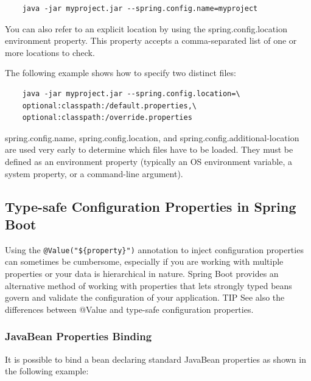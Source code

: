 \documentclass{scrartcl}
\begin{document}
\begin{lstlisting}
    java -jar myproject.jar --spring.config.name=myproject
\end{lstlisting}

You can also refer to an explicit location by using the spring.config.location environment property. This property accepts a comma-separated list of one or more locations to check.

The following example shows how to specify two distinct files:

\begin{lstlisting}
    java -jar myproject.jar --spring.config.location=\
    optional:classpath:/default.properties,\
    optional:classpath:/override.properties
\end{lstlisting}

spring.config.name, spring.config.location, and spring.config.additional-location are used very early to determine which files have to be loaded. They must be defined as an environment property (typically an OS environment variable, a system property, or a command-line argument).


\subsection{Type-safe Configuration Properties in Spring Boot}

Using the \lstinline|@Value("${property}")| annotation to inject configuration properties can sometimes be
cumbersome, especially if you are working with multiple properties or your data is hierarchical in
nature. Spring Boot provides an alternative method of working with properties that lets strongly
typed beans govern and validate the configuration of your application.
TIP
See also the differences between @Value and type-safe configuration properties.
\subsubsection{JavaBean Properties Binding}

It is possible to bind a bean declaring standard JavaBean properties as shown in the following
example:
\end{document}
